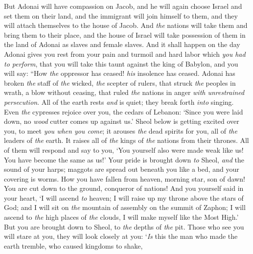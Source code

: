 \begin{biblechapter} %
 But Adonai will have compassion on Jacob, 
and he will again choose Israel 
and set them on their land, 
and the immigrant will join himself to them, 
and they will attach themselves to the house of Jacob.
\verse And \textit{the} nations will take them 
and bring them to their place, 
and the house of Israel will take possession of them in the land of Adonai 
as slaves and female slaves.
 And it shall happen on the day Adonai gives you rest from your pain and turmoil and hard labor which \textit{you had to perform},
\verse that you will take this taunt against the king of Babylon, 
and you will say: 
“How \textit{the} oppressor has ceased! 
\textit{his} insolence has ceased.
\verse Adonai has broken \textit{the} staff of \textit{the} wicked, 
\textit{the} scepter of rulers,
\verse that struck \textit{the} peoples in wrath, a blow without ceasing, 
that ruled \textit{the} nations in anger 
\textit{with unrestrained persecution}.
\verse All of the earth rests \textit{and} is quiet; 
they break forth \textit{into} singing.
\verse Even \textit{the} cypresses rejoice over you, 
the cedars of Lebanon: 
‘Since you were laid down, 
no \textit{wood} cutter comes up against us.’
\verse Sheol below is getting excited over you, 
to meet \textit{you when you come}; 
it arouses \textit{the} dead spirits for you, 
all of \textit{the} leaders of \textit{the} earth. 
It raises all of \textit{the} kings of \textit{the} nations from their thrones.
\verse All of them will respond and say to you, 
‘You yourself also were made weak like us! 
You have become the same as us!’
\verse Your pride is brought down \textit{to} Sheol, 
\textit{and} the sound of your harps; 
maggots are spread out beneath you like a bed, 
and your covering is worms.
\verse How you have fallen from heaven, morning star, son of dawn! 
You are cut down to the ground, conqueror of nations!
\verse And you yourself said in your heart,
\verse ‘I will ascend \textit{to} heaven; 
I will raise up my throne above the stars of God; 
and I will sit on \textit{the} mountain of assembly 
on the summit of Zaphon;
\verse I will ascend to \textit{the} high places of \textit{the} clouds, 
I will make myself like the Most High.’
\verse But you are brought down to Sheol, 
to \textit{the} depths of \textit{the} pit.
\verse Those who see you will stare at you, 
they will look closely at you: 
‘\textit{Is} this the man who made the earth tremble, 
who caused kingdoms to shake,

\end{biblechapter}
